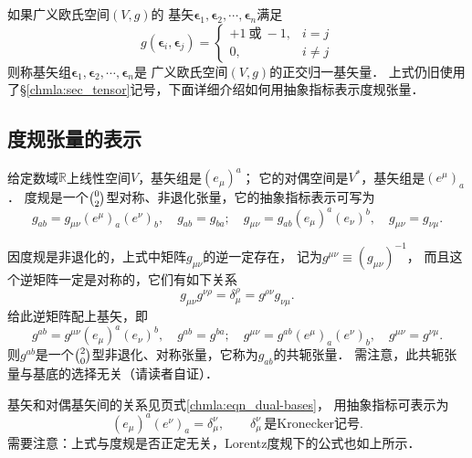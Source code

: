 如果广义欧氏空间$(V,g)$的
基矢$\boldsymbol{\epsilon}_1,\boldsymbol{\epsilon}_2,\cdots,\boldsymbol{\epsilon}_n$满足
\begin{equation}\label{chdm:eqn_unitary-bases}
    g(\boldsymbol{\epsilon}_i,\boldsymbol{\epsilon}_j) = 
    \begin{cases}
        +1 \ \text{或} \ -1, & i=j \\
        0, & i \neq j
    \end{cases}
\end{equation}
则称基矢组$\boldsymbol{\epsilon}_1,\boldsymbol{\epsilon}_2,\cdots,\boldsymbol{\epsilon}_n$是
广义欧氏空间$(V,g)$的{\heiti 正交归一}基矢量．
上式仍旧使用了\S\ref{chmla:sec_tensor}记号，下面详细介绍如何用抽象指标表示度规张量．


\subsection{度规张量的表示}\label{chdm:sec_metric-abi}
给定数域$\mathbb{R}$上线性空间$V$，基矢组是$(e_\mu)^a$；
它的对偶空间是$V^*$，基矢组是$(e^\mu)_a$．
度规是一个$\binom{0}{2}$型对称、非退化张量，它的抽象指标表示可写为
\begin{equation}\label{chdm:eqn_Euclid-gab}
    g_{ab} = g_{\mu\nu} (e^\mu)_a (e^\nu)_b, \quad g_{ab} = g_{ba}; \quad
    g_{\mu\nu} = g_{ab} (e_\mu)^a (e_\nu)^b, \quad g_{\mu\nu} = g_{\nu\mu}.
\end{equation}

因度规是非退化的，上式中矩阵$g_{\mu\nu}$的逆一定存在，
记为$g^{\mu\nu}\equiv (g_{\mu\nu})^{-1}$，
而且这个逆矩阵一定是对称的，它们有如下关系
\begin{equation}
    g_{\mu\nu} g^{\nu\rho}= \delta_\mu ^\rho = g^{\rho\nu}g_{\nu\mu} . 
\end{equation}
给此逆矩阵配上基矢，即
\begin{equation}
     g^{ab} = g^{\mu\nu} (e_\mu)^a (e_\nu)^b, \quad g^{ab} = g^{ba}; \quad
     g^{\mu\nu} = g^{ab} (e^\mu)_a (e^\nu)_b, \quad g^{\mu\nu} = g^{\nu\mu}.
\end{equation}
则$g^{ab}$是一个$\binom{2}{0}$型非退化、对称张量，它称为$g_{ab}$的{\heiti 共轭张量}．
需注意，此共轭张量与基底的选择无关（请读者自证）．

基矢和对偶基矢间的关系见\pageref{chmla:eqn_dual-bases}页式\eqref{chmla:eqn_dual-bases}，
用抽象指标可表示为
\begin{equation}
    (e_\mu )^a (e^\nu)_a =\delta_\mu ^\nu, \qquad 
    \delta_\mu ^\nu \, \text{是Kronecker记号} .
\end{equation}
需要注意：上式与度规是否正定无关，Lorentz度规下的公式也如上所示．


